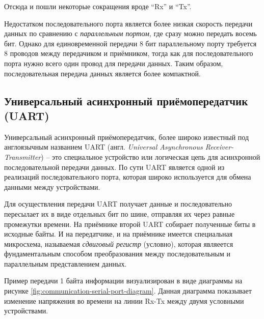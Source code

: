 \documentclass[../sparc.tex]{subfiles}
\begin{document}
Отсюда и пошли некоторые сокращения вроде ``Rx'' и
``Tx''.\autocite{so:krisw}

Недостатком последовательного порта является более низкая скорость передачи
данных по сравнению с \emph{параллельным портом}, где сразу можно передать
восемь бит.  Однако для единовременной передачи 8 бит параллельному порту
требуется 8 проводов между передачиком и приёмником, тогда как для
последовательного порта нужно всего один провод для передачи данных.  Таким
образом, последовательная передача данных является более компактной.

\subsection{Универсальный асинхронный приёмопередатчик (UART)}
\label{section:communication-uart}

Универсальный асинхронный приёмопередатчик, более широко известный под
англоязычным названием \gls{UART} (англ. \emph{Universal Asynchronous
Receiver-Transmitter}) -- это специальное устройство или логическая цепь для
асинхронной последовательной передачи данных.  По сути UART является одной из
реализаций последовательного порта, которая широко используется для обмена
данными между устройствами.

Для осуществления передачи UART получает данные и последовательно пересылает их
в виде отдельных бит по шине, отправляя их через равные промежутки времени.  На
приёмнике второй UART собирает полученные биты в исходные байты.  И на
передатчике, и на приёмнике имеется специальная микросхема, называемая
\emph{сдвиговый регистр} (условно), которая являеется фундаментальным способом
преобразования между последовательным и параллельным представлением данных.


Пример передачи 1 байта информации визуализирован в виде диаграммы на рисунке
\ref{fig:communication-serial-port-diagram}.  Данная диаграмма показывает
изменение напряжения во времени на линии Rx-Tx между двумя условными
устройствами.
\end{document}
